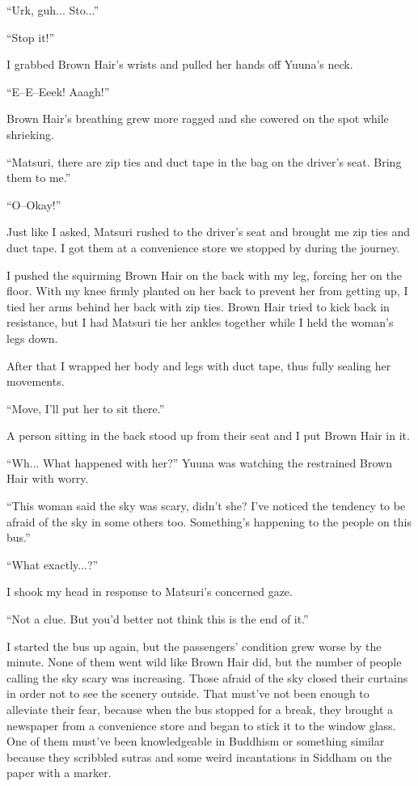 ``Urk, guh... Sto...''

``Stop it!''

I grabbed Brown Hair's wrists and pulled her hands off Yuuna's neck.

``E--E--Eeek! Aaagh!''

Brown Hair's breathing grew more ragged and she cowered on the spot while shrieking.

``Matsuri, there are zip ties and duct tape in the bag on the driver's seat. Bring them to me.''

``O--Okay!''

Just like I asked, Matsuri rushed to the driver's seat and brought me zip ties and duct tape. I got them at a convenience store we stopped by during the journey.

I pushed the squirming Brown Hair on the back with my leg, forcing her on the floor. With my knee firmly planted on her back to prevent her from getting up, I tied her arms behind her back with zip ties. Brown Hair tried to kick back in resistance, but I had Matsuri tie her ankles together while I held the woman's legs down.

After that I wrapped her body and legs with duct tape, thus fully sealing her movements.

``Move, I'll put her to sit there.''

A person sitting in the back stood up from their seat and I put Brown Hair in it.

``Wh... What happened with her?'' Yuuna was watching the restrained Brown Hair with worry.

``This woman said the sky was scary, didn't she? I've noticed the tendency to be afraid of the sky in some others too. Something's happening to the people on this bus.''

``What exactly...?''

I shook my head in response to Matsuri's concerned gaze.

``Not a clue. But you'd better not think this is the end of it.''

I started the bus up again, but the passengers' condition grew worse by the minute. None of them went wild like Brown Hair did, but the number of people calling the sky scary was increasing. Those afraid of the sky closed their curtains in order not to see the scenery outside. That must've not been enough to alleviate their fear, because when the bus stopped for a break, they brought a newspaper from a convenience store and began to stick it to the window glass. One of them must've been knowledgeable in Buddhism or something similar because they scribbled sutras and some weird incantations in Siddham on the paper with a marker.

